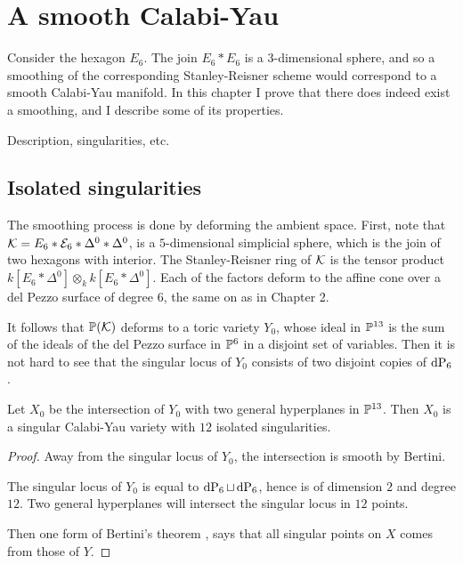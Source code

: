
\chapter{A smooth Calabi-Yau}

Consider the hexagon $E_6$. The join $E_6 \ast E_6$ is a $3$-dimensional sphere, and so a smoothing of the corresponding Stanley-Reisner scheme would correspond to a smooth Calabi-Yau manifold. In this chapter I prove that there does indeed exist a smoothing, and I describe some of its properties.

Description, singularities, etc.

\section{Isolated singularities}

The smoothing process is done by deforming the ambient space. First, note that $\mathcal K= E_6 \ast \mathcal E_6 \ast \Delta^0 \ast \Delta^0$, is a $5$-dimensional simplicial sphere, which is the join of two hexagons with interior. The Stanley-Reisner ring of $\mathcal K$ is the tensor product $k[E_6 \ast \Delta^0] \otimes_k k[E_6 \ast \Delta^0]$. Each of the factors deform to the affine cone over a del Pezzo surface of degree $6$, the same on as in Chapter 2.

It follows that $\mathbb{P}(\mathcal K)$ deforms to a toric variety $Y_0$, whose ideal in $\mathbb{P}^{13}$ is the sum of the ideals of the del Pezzo surface in $\mathbb{P}^6$ in a disjoint set of variables. Then it is not hard to see that the singular locus of $Y_0$ consists of two disjoint copies of $\dP6$. 

\begin{lemma}
Let $X_0$ be the intersection of $Y_0$ with two general hyperplanes in $\mathbb{P}^{13}$. Then $X_0$ is a singular Calabi-Yau variety with $12$ isolated singularities.
\end{lemma}
\begin{proof}
Away from the singular locus of $Y_0$, the intersection is smooth by Bertini.

The singular locus of $Y_0$ is equal to $\dP6 \sqcup \dP6$, hence is of dimension $2$ and degree $12$. Two general hyperplanes will intersect the singular locus in $12$ points. 

Then one form of Bertini's theorem \cite[page 216]{harris_alggeo}, says that all singular points on $X$ comes from those of $Y$. 
\end{proof}

